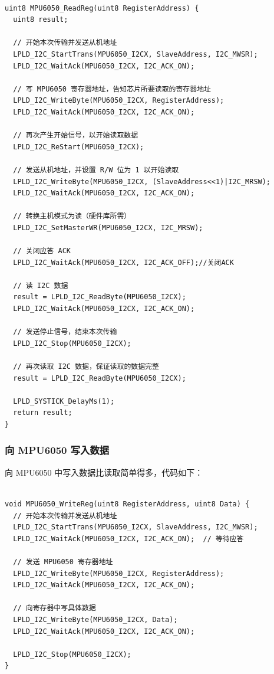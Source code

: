 \begin{verbatim}

uint8 MPU6050_ReadReg(uint8 RegisterAddress) {
  uint8 result;

  // 开始本次传输并发送从机地址
  LPLD_I2C_StartTrans(MPU6050_I2CX, SlaveAddress, I2C_MWSR);
  LPLD_I2C_WaitAck(MPU6050_I2CX, I2C_ACK_ON);

  // 写 MPU6050 寄存器地址，告知芯片所要读取的寄存器地址
  LPLD_I2C_WriteByte(MPU6050_I2CX, RegisterAddress);
  LPLD_I2C_WaitAck(MPU6050_I2CX, I2C_ACK_ON);

  // 再次产生开始信号，以开始读取数据
  LPLD_I2C_ReStart(MPU6050_I2CX);

  // 发送从机地址，并设置 R/W 位为 1 以开始读取
  LPLD_I2C_WriteByte(MPU6050_I2CX, (SlaveAddress<<1)|I2C_MRSW);
  LPLD_I2C_WaitAck(MPU6050_I2CX, I2C_ACK_ON);

  // 转换主机模式为读（硬件库所需）
  LPLD_I2C_SetMasterWR(MPU6050_I2CX, I2C_MRSW);

  // 关闭应答 ACK
  LPLD_I2C_WaitAck(MPU6050_I2CX, I2C_ACK_OFF);//关闭ACK

  // 读 I2C 数据
  result = LPLD_I2C_ReadByte(MPU6050_I2CX);
  LPLD_I2C_WaitAck(MPU6050_I2CX, I2C_ACK_ON);

  // 发送停止信号，结束本次传输
  LPLD_I2C_Stop(MPU6050_I2CX);

  // 再次读取 I2C 数据，保证读取的数据完整
  result = LPLD_I2C_ReadByte(MPU6050_I2CX);

  LPLD_SYSTICK_DelayMs(1);
  return result;
}

\end{verbatim}

\subsubsection{向 MPU6050 写入数据}
向 MPU6050 中写入数据比读取简单得多，代码如下：

\begin{verbatim}

void MPU6050_WriteReg(uint8 RegisterAddress, uint8 Data) {
  // 开始本次传输并发送从机地址
  LPLD_I2C_StartTrans(MPU6050_I2CX, SlaveAddress, I2C_MWSR);
  LPLD_I2C_WaitAck(MPU6050_I2CX, I2C_ACK_ON);  // 等待应答

  // 发送 MPU6050 寄存器地址
  LPLD_I2C_WriteByte(MPU6050_I2CX, RegisterAddress);
  LPLD_I2C_WaitAck(MPU6050_I2CX, I2C_ACK_ON);

  // 向寄存器中写具体数据
  LPLD_I2C_WriteByte(MPU6050_I2CX, Data);
  LPLD_I2C_WaitAck(MPU6050_I2CX, I2C_ACK_ON);

  LPLD_I2C_Stop(MPU6050_I2CX);
}

\end{verbatim}


